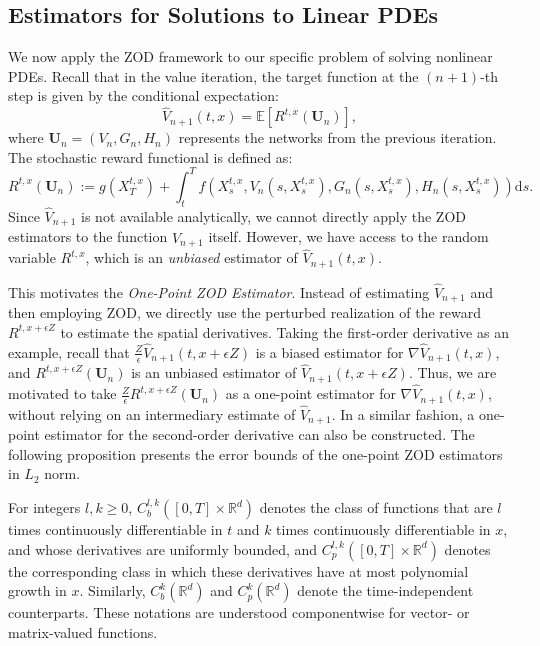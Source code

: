 \documentclass[twoside,11pt]{article}
\newcommand{\dd}{\mathrm{d}}
\newcommand{\E}{\mathbb{E}}
\newcommand{\1}{\mathbf{1}}
\numberwithin{equation}{section}
\begin{document}
\subsection{Estimators for Solutions to Linear PDEs}

We now apply the ZOD framework to our specific problem of solving nonlinear PDEs. Recall that in the value iteration, the target function at the $(n+1)$-th step is given by the conditional expectation:
\begin{equation}\label{eq: value function}
    \hat{V}_{n+1}(t,x) = \E \left[ R^{t,x}(\mathbf{U}_n) \right],
\end{equation}
where $\mathbf{U}_n = (V_n, G_n, H_n)$ represents the networks from the previous iteration. The stochastic reward functional is defined as:
\begin{equation}\label{eq: def reward}
    R^{t,x}(\mathbf{U}_n) := g(X_T^{t,x}) + \int_t^T f\left(  X^{t,x}_s, V_n(s, X^{t,x}_s), G_n(s, X^{t,x}_s), H_n(s, X_s^{t,x})\right) \dd s.
\end{equation}
Since $\hat{V}_{n+1}$ is not available analytically, we cannot directly apply the ZOD estimators to the function $\hat{V}_{n+1}$ itself. However, we have access to the random variable $R^{t,x}$, which is an {\it unbiased} estimator of $\hat{V}_{n+1}(t,x)$.


This motivates the {\it One-Point ZOD Estimator}. Instead of estimating $\hat{V}_{n+1}$ and then employing ZOD, we directly use the perturbed realization of the reward $R^{t, x+\epsilon Z}$ to estimate the spatial derivatives.
Taking the first-order derivative as an example, recall that $\frac{Z}{\epsilon}\hat V_{n+1}(t,x+\epsilon Z)$ is a biased estimator for $\nabla \hat V_{n+1}(t,x)$, and $R^{t,x+\epsilon Z}(\mathbf{U}_n)$ is an unbiased estimator of $\hat V_{n+1}(t,x+\epsilon Z)$. Thus, we are motivated to take $\frac{Z}{\epsilon}R^{t,x+\epsilon Z}(\mathbf{U}_n)$ as a one-point estimator for $\nabla \hat V_{n+1}(t,x)$, without relying on an intermediary estimate of $\hat V_{n+1}$. In a similar fashion, a one-point estimator for the second-order derivative can also be constructed. The following proposition presents the error bounds of the one-point ZOD estimators in $ L_2$ norm.

For integers $l,k\ge0$, $C_b^{l,k}([0,T]\times\mathbb R^d)$ denotes the class of functions that are $ l$ times continuously differentiable in $t$ and $k$ times continuously differentiable in $x$, and whose derivatives are uniformly bounded, and $C_p^{l,k}([0,T]\times\mathbb R^d)$ denotes the corresponding class in which these derivatives have at most polynomial growth in $x$. Similarly, $C_b^k(\mathbb R^d)$ and $C_p^k(\mathbb R^d)$ denote the time-independent counterparts. These notations are understood componentwise for vector- or matrix-valued functions.
\end{document}
